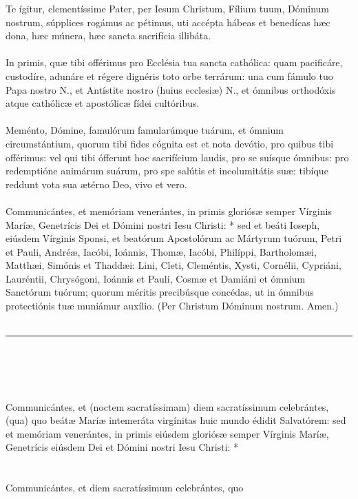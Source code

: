 \documentclass[12pt, a4paper]{article}
\begin{document}
	Te ígitur, clementíssime Pater,
	per Iesum Christum, Fílium tuum,
	Dóminum nostrum, súpplices
	rogámus ac pétimus, uti accépta
	hábeas et benedícas hæc dona,
	hæc múnera, hæc sancta sacrifícia
	illibáta.
	\\\\
	In primis, quæ tibi offérimus
	pro Ecclésia tua sancta cathólica:
	quam pacificáre, custodíre, adunáre
	et régere dignéris toto orbe
	terrárum: una cum fámulo tuo Papa
	nostro N., et Antístite nostro
	(huius ecclesiæ) N., et ómnibus
	orthodóxis atque cathólicæ et
	apostólicæ fídei cultóribus.
	\\\\
	Meménto, Dómine, famulórum
	famularúmque tuárum, et ómnium
	circumstántium, quorum tibi fides
	cógnita est et nota devótio, pro
	quibus tibi offérimus: vel qui tibi
	ófferunt hoc sacrifícium laudis, pro
	se suísque ómnibus: pro
	redemptióne animárum suárum,
	pro spe salútis et incolumitátis suæ:
	tibíque reddunt vota sua ætérno
	Deo, vivo et vero.
	\\\\
	Communicántes, et memóriam
	venerántes, in primis gloriósæ
	semper Vírginis Maríæ, Genetrícis
	Dei et Dómini nostri Iesu Christi: *
	sed et beáti Ioseph, eiúsdem
	Vírginis Sponsi, et beatórum
	Apostolórum ac Mártyrum tuórum,
	Petri et Pauli, Andréæ, Iacóbi,
	Ioánnis, Thomæ, Iacóbi, Philíppi,
	Bartholomæi, Matthæi, Simónis et
	Thaddæi: Lini, Cleti, Cleméntis,
	Xysti, Cornélii, Cypriáni, Lauréntii,
	Chrysógoni, Ioánnis et Pauli,
	Cosmæ et Damiáni et ómnium
	Sanctórum tuórum; quorum méritis
	precibúsque concédas, ut in
	ómnibus protectiónis tuæ
	muniámur auxílio. (Per Christum
	Dóminum nostrum. Amen.)
	\\\\
	\noindent\rule{10cm}{0.4pt}
	\\\\
	\\
	\\
	Communicántes, et (noctem
	sacratíssimam) diem sacratíssimum
	celebrántes, (qua) quo beátæ Maríæ
	intemeráta virgínitas huic mundo
	édidit Salvatórem: sed et
	memóriam venerántes, in primis
	eiúsdem gloriósæ semper Vírginis
	Maríæ, Genetrícis eiúsdem Dei et
	Dómini nostri Iesu Christi: *
	\\\\
	\\
	Communicántes, et diem
	sacratíssimum celebrántes, quo
\end{document}
